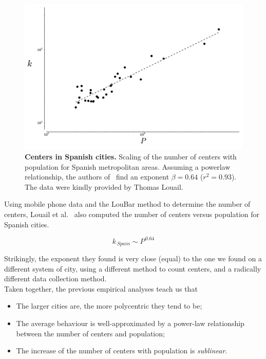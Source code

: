 \begin{figure}
    \centering
    \includegraphics[width=\textwidth]{gfx/chapter-monocentric/spain_num-centers.pdf}
    \caption{{\bf Centers in Spanish cities.} Scaling of the number of centers with population for Spanish
        metropolitan areas. Assuming a powerlaw relationship, the authors
    of~\cite{Louail:2014} find an exponent $\beta = 0.64$ ($r^2=0.93$). The data
were kindly provided by Thomas Louail.\label{fig:centers_spain}}
\end{figure}

Using mobile phone data and the LouBar method to determine the number of
centers, Louail et al.~\cite{Louail:2014} also computed the number of centers
versus population for Spanish cities. 

\begin{equation}
    k_{\,Spain} \sim P^{\,0.64}
\end{equation}

Strikingly, the exponent they found is very close (equal) to the one we found on a
different system of city, using a different method to count centers, and a
radically different data collection method.\\

Taken together, the previous empirical analyses teach us that
\begin{itemize}
    \item The larger cities are, the
more polycentric they tend to be; 
    \item The average behaviour is well-approximated
by a power-law relationship between the number of centers and population;
    \item The increase of the number of centers with population is \emph{sublinear}.  
\end{itemize}

